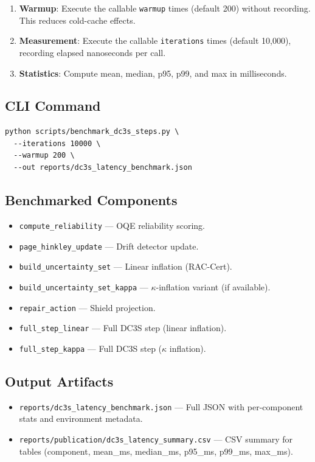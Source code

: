 \begin{enumerate}
\item \textbf{Warmup}: Execute the callable \texttt{warmup} times (default 200) without recording. This reduces cold-cache effects.
\item \textbf{Measurement}: Execute the callable \texttt{iterations} times (default 10,000), recording elapsed nanoseconds per call.
\item \textbf{Statistics}: Compute mean, median, p95, p99, and max in milliseconds.
\end{enumerate}

\subsection{CLI Command}

\begin{verbatim}
python scripts/benchmark_dc3s_steps.py \
  --iterations 10000 \
  --warmup 200 \
  --out reports/dc3s_latency_benchmark.json
\end{verbatim}

\subsection{Benchmarked Components}

\begin{itemize}
\item \texttt{compute\_reliability} --- OQE reliability scoring.
\item \texttt{page\_hinkley\_update} --- Drift detector update.
\item \texttt{build\_uncertainty\_set} --- Linear inflation (RAC-Cert).
\item \texttt{build\_uncertainty\_set\_kappa} --- $\kappa$-inflation variant (if available).
\item \texttt{repair\_action} --- Shield projection.
\item \texttt{full\_step\_linear} --- Full DC3S step (linear inflation).
\item \texttt{full\_step\_kappa} --- Full DC3S step ($\kappa$ inflation).
\end{itemize}

\subsection{Output Artifacts}

\begin{itemize}
\item \texttt{reports/dc3s\_latency\_benchmark.json} --- Full JSON with per-component stats and environment metadata.
\item \texttt{reports/publication/dc3s\_latency\_summary.csv} --- CSV summary for tables (component, mean\_ms, median\_ms, p95\_ms, p99\_ms, max\_ms).
\end{itemize}

